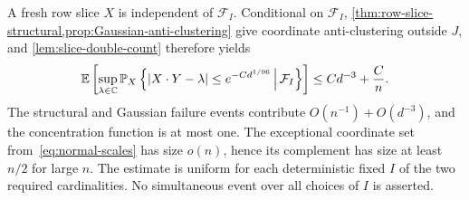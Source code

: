 A fresh row slice $X$ is independent of $\mathcal F_I$. Conditional on $\mathcal F_I$, 
\cref{thm:row-slice-structural,prop:Gaussian-anti-clustering} give coordinate anti-clustering outside $J$, and 
\cref{lem:slice-double-count} therefore yields
\begin{equation}\label{eq:averaged-normal-small-ball}
  \mathbb E\left[
  \sup_{\lambda\in\mathbb C}
  \mathbb P_X\left\{|X\cdot Y-\lambda|\le e^{-Cd^{1/96}}\,\middle|\,\mathcal F_I\right\}
  \right]
  \le Cd^{-3}+\frac Cn.
\end{equation}
The structural and Gaussian failure events contribute $O(n^{-1})+O(d^{-3})$, and the concentration function is at most one. The exceptional coordinate set from~\eqref{eq:normal-scales} has size $o(n)$, hence its complement has size at least $n/2$ for large $n$. The estimate is uniform for each deterministic fixed $I$ of the two required cardinalities. No simultaneous event over all choices of $I$ is asserted.
